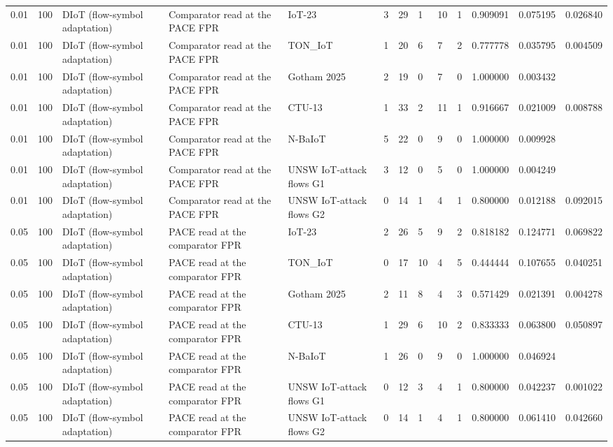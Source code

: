 \begin{tabular}{lllllllllllll}
0.01 & 100 & DIoT (flow-symbol adaptation) & Comparator read at the PACE FPR & IoT-23 & 3 & 29 & 1 & 10 & 1 & 0.909091 & 0.075195 & 0.026840 \\
0.01 & 100 & DIoT (flow-symbol adaptation) & Comparator read at the PACE FPR & TON\_IoT & 1 & 20 & 6 & 7 & 2 & 0.777778 & 0.035795 & 0.004509 \\
0.01 & 100 & DIoT (flow-symbol adaptation) & Comparator read at the PACE FPR & Gotham 2025 & 2 & 19 & 0 & 7 & 0 & 1.000000 & 0.003432 &  \\
0.01 & 100 & DIoT (flow-symbol adaptation) & Comparator read at the PACE FPR & CTU-13 & 1 & 33 & 2 & 11 & 1 & 0.916667 & 0.021009 & 0.008788 \\
0.01 & 100 & DIoT (flow-symbol adaptation) & Comparator read at the PACE FPR & N-BaIoT & 5 & 22 & 0 & 9 & 0 & 1.000000 & 0.009928 &  \\
0.01 & 100 & DIoT (flow-symbol adaptation) & Comparator read at the PACE FPR & UNSW IoT-attack flows G1 & 3 & 12 & 0 & 5 & 0 & 1.000000 & 0.004249 &  \\
0.01 & 100 & DIoT (flow-symbol adaptation) & Comparator read at the PACE FPR & UNSW IoT-attack flows G2 & 0 & 14 & 1 & 4 & 1 & 0.800000 & 0.012188 & 0.092015 \\
0.05 & 100 & DIoT (flow-symbol adaptation) & PACE read at the comparator FPR & IoT-23 & 2 & 26 & 5 & 9 & 2 & 0.818182 & 0.124771 & 0.069822 \\
0.05 & 100 & DIoT (flow-symbol adaptation) & PACE read at the comparator FPR & TON\_IoT & 0 & 17 & 10 & 4 & 5 & 0.444444 & 0.107655 & 0.040251 \\
0.05 & 100 & DIoT (flow-symbol adaptation) & PACE read at the comparator FPR & Gotham 2025 & 2 & 11 & 8 & 4 & 3 & 0.571429 & 0.021391 & 0.004278 \\
0.05 & 100 & DIoT (flow-symbol adaptation) & PACE read at the comparator FPR & CTU-13 & 1 & 29 & 6 & 10 & 2 & 0.833333 & 0.063800 & 0.050897 \\
0.05 & 100 & DIoT (flow-symbol adaptation) & PACE read at the comparator FPR & N-BaIoT & 1 & 26 & 0 & 9 & 0 & 1.000000 & 0.046924 &  \\
0.05 & 100 & DIoT (flow-symbol adaptation) & PACE read at the comparator FPR & UNSW IoT-attack flows G1 & 0 & 12 & 3 & 4 & 1 & 0.800000 & 0.042237 & 0.001022 \\
0.05 & 100 & DIoT (flow-symbol adaptation) & PACE read at the comparator FPR & UNSW IoT-attack flows G2 & 0 & 14 & 1 & 4 & 1 & 0.800000 & 0.061410 & 0.042660 \\

\end{tabular}
